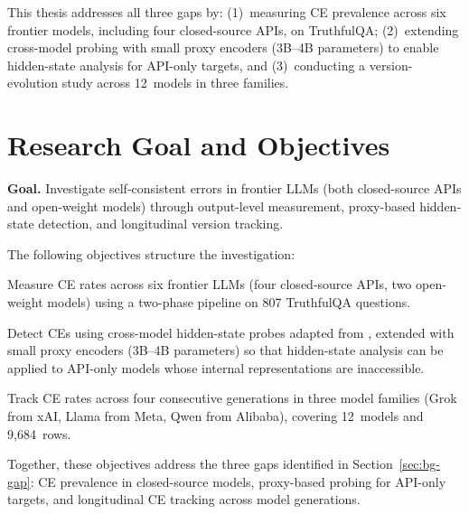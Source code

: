 \documentclass[12pt,twocolumn]{article}
\begin{document}
This thesis addresses all three gaps by: (1)~measuring CE prevalence
across six frontier models, including four closed-source APIs, on
TruthfulQA; (2)~extending cross-model probing with small
proxy encoders (3B--4B parameters) to enable hidden-state analysis
for API-only targets, and (3)~conducting a version-evolution study
across 12~models in three families.

\section{Research Goal and Objectives}
\label{sec:goals}

\textbf{Goal.} Investigate self-consistent errors in frontier
LLMs (both closed-source APIs and open-weight models) through
output-level measurement, proxy-based hidden-state detection, and
longitudinal version tracking.

The following objectives structure the investigation:

\begin{description}[nosep,leftmargin=0.5cm,font=\normalfont\bfseries]
\item[O1: Black-box CE measurement (RQ1).] Measure CE rates across
  six frontier LLMs (four closed-source APIs, two open-weight models)
  using a two-phase pipeline on 807 TruthfulQA questions.
\item[O2: Proxy-based CE detection (RQ2).] Detect CEs using
  cross-model hidden-state probes adapted from
  \citet{tan2025consistent}, extended with small proxy encoders
  (3B--4B parameters) so that hidden-state analysis can be applied
  to API-only models whose internal representations are inaccessible.
\item[O3: Version-evolution tracking (RQ3).] Track CE rates across
  four consecutive generations in three model families (Grok from
  xAI, Llama from Meta, Qwen from Alibaba), covering 12~models and
  9,684~rows.
\end{description}

Together, these objectives address the three gaps identified in
Section~\ref{sec:bg-gap}: CE prevalence in closed-source models,
proxy-based probing for API-only targets, and longitudinal CE
tracking across model generations.

\end{document}

